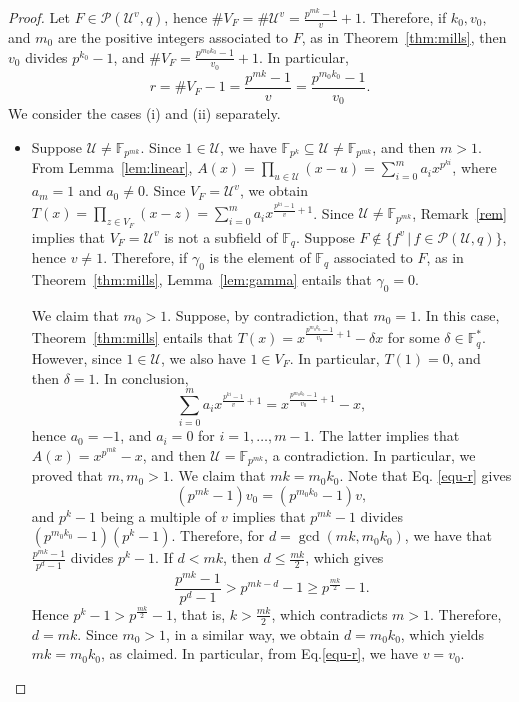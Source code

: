 \documentclass[11pt]{amsart}
\newcommand{\F}{\mathbb{F}}
\newcommand{\pp}{\mathcal P}
\theoremstyle{definition}
\theoremstyle{remark}
\begin{document}
\begin{proof}
Let $F\in\mathcal P(\mathcal U^v, q)$, hence $\# V_F=\# \mathcal U^v=\frac{p^{mk}-1}{v}+1$. Therefore, if $k_0, v_0,$ and  $m_0$ are the positive integers associated to $F$, as in Theorem~\ref{thm:mills}, then $v_0$ divides $p^{k_0}-1$, and $\# V_F=\frac{p^{m_0k_0}-1}{v_0}+1$. In particular, 
\begin{equation}\label{equ-r}
r=\#V_F-1=\frac{p^{mk}-1}{v}=\frac{p^{m_0k_0}-1}{v_0}.
 \end{equation}
  We consider the cases (i) and (ii) separately.
\begin{itemize}%
\item Suppose 
$\mathcal U\ne \F_{p^{mk}}$. %
Since $1\in \mathcal U$, we have $\F_{p^k}\subseteq \mathcal U\ne \F_{p^{mk}}$, and then $m>1$. From Lemma~\ref{lem:linear}, $A(x)=\prod_{u\in \mathcal U}(x-u)=\sum_{i=0}^ma_ix^{p^{ki}}$, where $a_m=1$ and $a_0\ne 0$. Since $V_F=\mathcal U^v$, we obtain $T(x)=\prod_{z\in V_F}(x-z)=\sum_{i=0}^ma_ix^{\frac{p^{ki}-1}{v}+1}$. Since $\mathcal U\ne \F_{p^{mk}}$, Remark~\ref{rem} implies that $V_F=\mathcal U^v$ is not a subfield of $\F_q$. Suppose $F\not\in \{f^v\,|\, f\in \mathcal P(\mathcal U, q)\}$, hence $v\ne 1$. Therefore, if $\gamma_0$ is the element of $\F_q$ associated to $F$,  as in Theorem~\ref{thm:mills}, Lemma~\ref{lem:gamma} entails that $\gamma_0=0$. 

We claim that $m_0>1$. Suppose, by contradiction, that $m_0=1$. In this case, Theorem~\ref{thm:mills} entails that $T(x)=x^{\frac{p^{m_0k_0}-1}{v_0}+1}-\delta x$ for some $\delta\in \F_q^*$. However, since $1\in \mathcal U$, we also have $1\in V_F$. In particular, $T(1)=0$, and then $\delta=1$. In conclusion, 
$$\sum_{i=0}^ma_ix^{\frac{p^{ki}-1}{v}+1}=x^{\frac{p^{m_0k_0}-1}{v_0}+1}- x,$$
hence $a_0=-1$,  and $a_i=0$ for $i=1, \ldots,m-1$. The latter implies that $A(x)=x^{p^{mk}}-x$, and then $\mathcal U=\F_{p^{mk}}$, a contradiction. In particular, we proved that $m, m_0>1$.   We claim that $mk=m_0k_0$.  Note that Eq. \eqref{equ-r}  gives
$$(p^{mk}-1)v_0= (p^{m_0k_0}-1)v,$$
and $p^k-1$ being a multiple of  $v$ implies that $p^{mk}-1$ divides $(p^{m_0k_0}-1)(p^k-1)$. Therefore,  for $d=\gcd(mk, m_0k_0)$, we have that 
$\frac{p^{mk}-1}{p^d-1}$ divides $p^k-1$. If $d<mk$, then  $d\le \frac{mk}{2}$,  which  gives
$$\frac{p^{mk}-1}{p^d-1}>p^{mk-d}-1\ge p^{\frac{mk}{2}}-1.$$
Hence $p^k-1>p^{\frac{mk}{2}}-1$, that is,  $k>\frac{mk}{2}$, which contradicts  $m>1$. Therefore,  $d=mk$.  Since $m_0>1$,  in a similar way, we obtain $d=m_0k_0$, which yields  $mk=m_0k_0$,  as claimed. In particular, from Eq.\eqref{equ-r},   we have $v=v_0$.



\end{itemize}
\end{proof}
\end{document}
